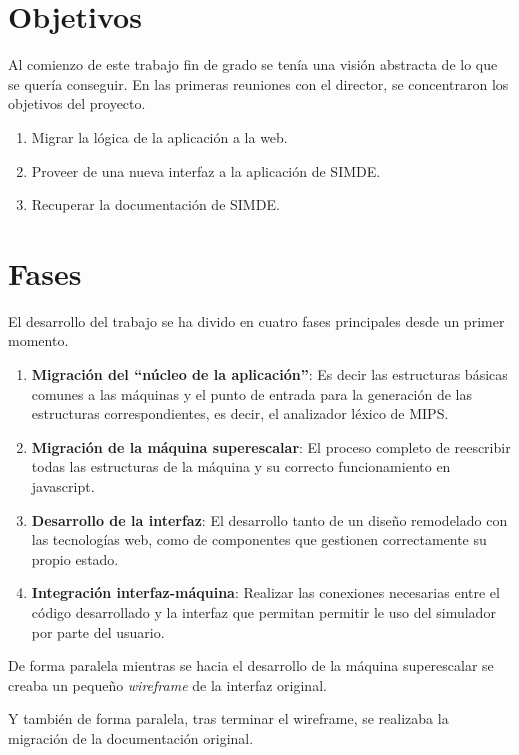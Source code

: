 
\section{Objetivos}
\label{4:sec1}

Al comienzo de este trabajo fin de grado se tenía una visión abstracta de lo que
se quería conseguir. En las primeras reuniones con el director, se concentraron 
los objetivos del proyecto.

\begin{enumerate}

\item Migrar la lógica de la aplicación a la web.

\item Proveer de una nueva interfaz a la aplicación de SIMDE.

\item Recuperar la documentación de SIMDE.

\end{enumerate}

\section{Fases}
\label{4:sec2}

El desarrollo del trabajo se ha divido en cuatro fases principales desde un
primer momento.

\begin{enumerate}
   \item \textbf{Migración del “núcleo de la aplicación”}: Es decir las estructuras básicas 
   comunes a las máquinas y el punto de entrada para la generación de las estructuras 
   correspondientes, es decir, el analizador léxico de MIPS.

   \item \textbf{Migración de la máquina superescalar}: El proceso completo de reescribir 
   todas las estructuras de la máquina y su correcto funcionamiento en javascript.

   \item \textbf{Desarrollo de la interfaz}: El desarrollo tanto de un diseño remodelado 
   con las tecnologías web, como de componentes que gestionen correctamente su propio estado.
   
   \item \textbf{Integración interfaz-máquina}: Realizar las conexiones necesarias entre el 
   código desarrollado y la interfaz que permitan permitir le uso del simulador por parte del usuario.

\end{enumerate}

De forma paralela mientras se hacia el desarrollo de la máquina superescalar se creaba 
un pequeño \textit{wireframe} de la interfaz original. 

\bigskip
Y también de forma paralela, tras terminar el wireframe, se realizaba la migración 
de la documentación original.

